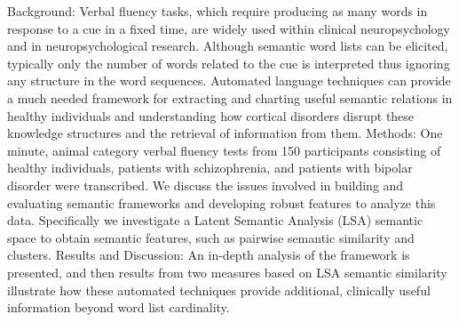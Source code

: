 Background: Verbal fluency tasks, which require producing as many words in response to a cue in a fixed time, are widely used within clinical neuropsychology and in neuropsychological research. Although semantic word lists can be elicited, typically only the number of words related to the cue is interpreted thus ignoring any structure in the word sequences. Automated language techniques can provide a much needed framework for extracting and charting useful semantic relations in healthy individuals and understanding how cortical disorders disrupt these knowledge structures and the retrieval of information from them. Methods: One minute, animal category verbal fluency tests from 150 participants consisting of healthy individuals, patients with schizophrenia, and patients with bipolar disorder were transcribed. We discuss the issues involved in building and evaluating semantic frameworks and developing robust features to analyze this data. Specifically we investigate a Latent Semantic Analysis (LSA) semantic space to obtain semantic features, such as pairwise semantic similarity and clusters. Results and Discussion: An in-depth analysis of the framework is presented, and then results from two measures based on LSA semantic similarity illustrate how these automated techniques provide additional, clinically useful information beyond word list cardinality.
